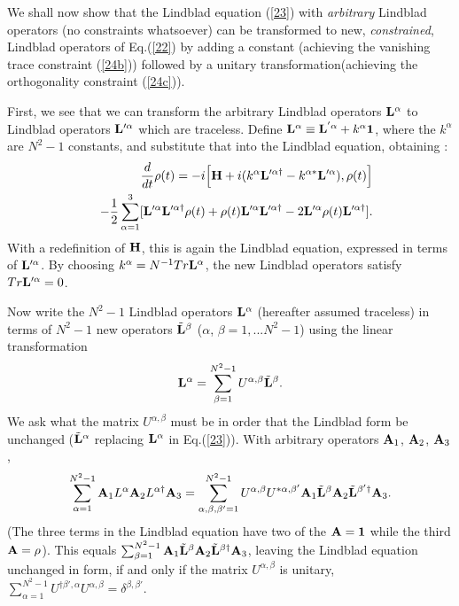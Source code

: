 \documentclass[aps,pra,twocolumn,amssymb, amsfonts,amsmath,showpacs, superscriptaddress]{revtex4}
\begin{document}
 We shall now show that the Lindblad equation (\ref{23}) with \textit{arbitrary} Lindblad operators (no constraints whatsoever)  can be transformed to new, \textit{constrained},  Lindblad operators of Eq.(\ref{22}) by adding a constant (achieving the vanishing trace constraint  (\ref{24b})) followed by a unitary transformation(achieving the orthogonality constraint  (\ref{24c})).
 
 
First, we see that we can transform the arbitrary Lindblad operators ${\bf L}^{\alpha}$ to Lindblad operators ${\bf L}'^{\alpha}$ which are traceless.   Define ${\bf L}^{\alpha}\equiv{\bf L}^{'\alpha}+k^{\alpha}{\bf 1}$, where the $k^{\alpha}$ are $N^{2}-1$ constants,  and substitute that into the Lindblad equation, obtaining :
 \begin{eqnarray}
&&\frac{d}{dt}{\bf\rho}(t)=-i\Big[{\bf H}+i(k^{\alpha}{\bf L}'^{\alpha\dagger}-k^{\alpha*}{\bf L}'^{\alpha}), {\bf\rho}(t)\Big]\nonumber\\
&&-\frac{1}{2}\sum_{\alpha=1}^{3}[{\bf L}'^{\alpha}{\bf L}'^{\alpha\dagger} {\bf\rho}(t)+ {\bf\rho}(t){\bf L}'^{\alpha}{\bf L}'^{\alpha\dagger}-2{\bf L}'^{\alpha}{\bf\rho}(t){\bf L}'^{\alpha\dagger}].\nonumber
 \end{eqnarray}
\noindent With a redefinition of ${\bf H}$, this is again the Lindblad equation, expressed in terms of ${\bf L}'^{\alpha}$. By choosing $k^{\alpha}=N^{-1}Tr{\bf L}^{\alpha}$, the new Lindblad operators satisfy $Tr{\bf L}'^{\alpha}=0$.  

Now write the $N^{2}-1$ Lindblad operators ${\bf L}^{\alpha}$  (hereafter assumed traceless) in terms of $N^{2}-1$ new operators $\tilde{\bf L}^{\beta}$ ($\alpha$, $\beta =1,... N^{2}-1$) using the linear transformation
\begin{equation}\label{25}
{\bf L}^{\alpha}=\sum_{\beta=1}^{N^{2}-1}U^{\alpha, \beta}\tilde{\bf L}^{\beta}.
\end{equation}
\noindent We ask what the matrix $U^{\alpha, \beta}$ must be in order that the Lindblad form be unchanged ($\tilde{\bf L}^{\alpha}$ replacing ${\bf L}^{\alpha}$  
in Eq.(\ref{23})).  With arbitrary  operators ${\bf A}_{1}$, ${\bf A}_{2}$, ${\bf A}_{3}$,  
\[
\sum_{\alpha=1}^{N^{2}-1}{\bf A}_{1}L^{\alpha}{\bf A}_{2}L^{\alpha\dagger}{\bf A}_{3}=\sum_{\alpha,\beta, \beta'=1}^{N^{2}-1}U^{\alpha, \beta}U^{*\alpha, \beta'}{\bf A}_{1}\tilde{\bf L}^{\beta}{\bf A}_{2}
\tilde{\bf  L}^{\beta'\dagger}{\bf A}_{3}.
\]
\noindent (The three terms in the Lindblad equation have two of the ${\bf A}={\bf 1}$ while the third  ${\bf A}={\bf \rho}$).  This  equals $\sum_{\beta=1}^{N^{2}-1}{\bf A}_{1}\tilde{\bf L}^{\beta}{\bf A}_{2}\tilde{\bf L}^{\beta\dagger}{\bf A}_{3}$, leaving  
the Lindblad equation unchanged in form, if and only if the  matrix $U^{\alpha, \beta}$ is unitary, $\sum_{\alpha=1}^{N^{2}-1}U^{\dagger\beta', \alpha}U^{\alpha, \beta}=\delta^{\beta,\beta'}$.
\end{document}
